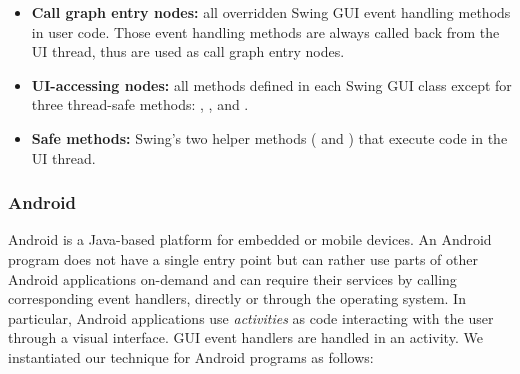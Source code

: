 \begin{itemize}

\item \textbf{Call graph entry nodes:} all overridden Swing GUI event handling
methods in user code. Those event handling methods are always
called back from the UI thread, thus are used as call graph entry nodes.

\item \textbf{UI-accessing nodes:} %
all methods defined in each Swing GUI class except for three thread-safe
methods: , , and .


\item \textbf{Safe methods: }  Swing's two helper methods
(  and ) that execute code in the UI thread.

\end{itemize}

\subsubsection{Android}

Android is a Java-based platform for embedded or mobile devices. 
An Android program does not have a single entry point but can
rather use parts of other Android applications on-demand and can require their
services by calling corresponding event handlers, directly or through the
operating system. In particular, Android applications use \textit{activities}
as code interacting with the user through a visual interface. GUI event handlers
are handled in an activity.
We instantiated our technique for Android programs as follows:




